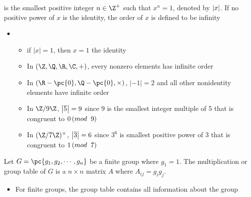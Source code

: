 \documentclass[11pt]{article}
\begin{document}
\begin{definition*}
     is the smallest positive integer $n\in\Z^+$ such that $x^n=1$, denoted by $\left|x\right|$. If no positive power of $x$ is the identity, the order of $x$ is defined to be infinity
    \begin{itemize}
        \item {}
        \begin{itemize}
            \item if $|x|=1$, then $x=1$ the identity
            \item In $(\Z,\Q,\R,\C, +)$, every nonzero elements has infinite order
            \item In $(\R-\pc{0}, \Q-\pc{0}, \times)$, $|-1|=2$ and all other nonidentity elements have infinite order
            \item In $\integermodn[9]$, $\left|\overline{5}\right| = 9$ since $9$ is the smallest integer multiple of 5 that is congruent to $0 \left(mod \;\; 9 \right)$
            \item In $\integermodnmul[7]$, $\left|\overline{3}\right| = 6$ since $3^6$ is smallest positive power of $3$ that is congruent to $1 \left(mod \;\; 7 \right)$
        \end{itemize}
    \end{itemize}
\end{definition*}

\begin{definition*}
     Let $G= \pc{g_1, g_2, \cdots, g_n}$ be a finite group where $g_1 = 1$. The multiplication or group table of $G$ is a $n\times n$ matrix $A$ where $A_{ij} = g_i g_j$. 
    \begin{itemize}
        \item {} For finite groups, the group table contains all information about the group
    \end{itemize}
\end{definition*}



\section{}
\end{document}
